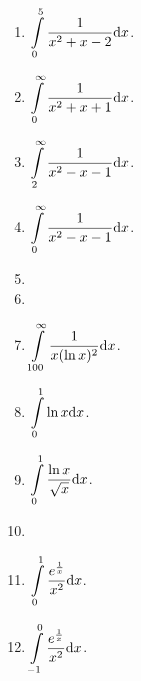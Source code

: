 \begin{multicols}{2}
\begin{enumerate}[ref={\fcProblemRef}]
\item $\displaystyle \int\limits_{0}^{5}\frac{1}{x^2+x-2} {\normalfont \text{d}} x$.

\item $\displaystyle \int\limits_{0}^{\infty}\frac{1}{x^2+x+1} {\normalfont \text{d}} x$.

\item $\displaystyle \int\limits_{2}^{\infty}\frac{1}{x^2-x-1} {\normalfont \text{d}} x$.

\item $\displaystyle \int\limits_{0}^{\infty}\frac{1}{x^2-x-1} {\normalfont \text{d}} x$.

\item 
\item 

\item $\displaystyle \int\limits_{100}^{\infty} \frac{1}{x(\ln x)^2} {\normalfont \text{d}} x$.

\item $\displaystyle \int\limits_{0}^{1}\ln x {\normalfont \text{d}} x$.

\item $\displaystyle \int\limits_{0}^{1}\frac{\ln x}{\sqrt{x}} {\normalfont \text{d}} x$.

\item 
\item $\displaystyle \int\limits_{0}^{1} \frac{e^{\frac{1}{x}}}{x^2} {\normalfont \text{d}} x$.

\item $\displaystyle \int\limits_{-1}^{0} \frac{e^{\frac{1}{x}}}{x^2} {\normalfont \text{d}} x$.


\end{enumerate}
\end{multicols}
